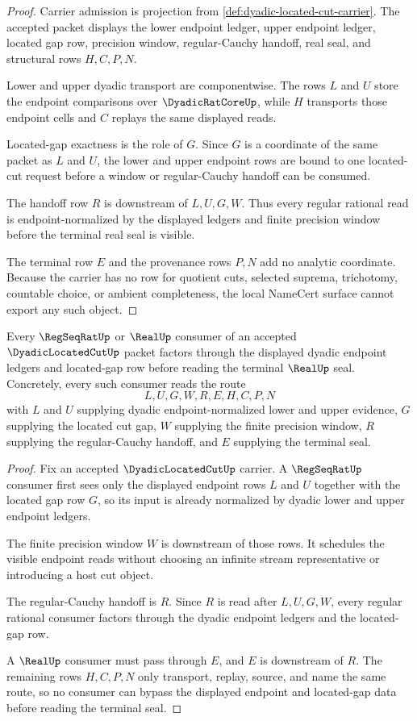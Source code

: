 \begin{proof}
Carrier admission is projection from \autoref{def:dyadic-located-cut-carrier}. The accepted packet displays the lower endpoint ledger, upper endpoint ledger, located gap row, precision window, regular-Cauchy handoff, real seal, and structural rows $H,C,P,N$.

Lower and upper dyadic transport are componentwise. The rows $L$ and $U$ store the endpoint comparisons over $\DyadicRatCoreUp$, while $H$ transports those endpoint cells and $C$ replays the same displayed reads.

Located-gap exactness is the role of $G$. Since $G$ is a coordinate of the same packet as $L$ and $U$, the lower and upper endpoint rows are bound to one located-cut request before a window or regular-Cauchy handoff can be consumed.

The handoff row $R$ is downstream of $L,U,G,W$. Thus every regular rational read is endpoint-normalized by the displayed ledgers and finite precision window before the terminal real seal is visible.

The terminal row $E$ and the provenance rows $P,N$ add no analytic coordinate. Because the carrier has no row for quotient cuts, selected suprema, trichotomy, countable choice, or ambient completeness, the local NameCert surface cannot export any such object.
\end{proof}

\begin{theorem}
\label{thm:dyadic-located-cut-regular-cauchy-handoff}
Every $\RegSeqRatUp$ or $\RealUp$ consumer of an accepted $\DyadicLocatedCutUp$ packet factors through the displayed dyadic endpoint ledgers and located-gap row before reading the terminal $\RealUp$ seal. Concretely, every such consumer reads the route
$$
L,U,G,W,R,E,H,C,P,N
$$
with $L$ and $U$ supplying dyadic endpoint-normalized lower and upper evidence, $G$ supplying the located cut gap, $W$ supplying the finite precision window, $R$ supplying the regular-Cauchy handoff, and $E$ supplying the terminal seal.
\end{theorem}
\begin{proof}
Fix an accepted $\DyadicLocatedCutUp$ carrier. A $\RegSeqRatUp$ consumer first sees only the displayed endpoint rows $L$ and $U$ together with the located gap row $G$, so its input is already normalized by dyadic lower and upper endpoint ledgers.

The finite precision window $W$ is downstream of those rows. It schedules the visible endpoint reads without choosing an infinite stream representative or introducing a host cut object.

The regular-Cauchy handoff is $R$. Since $R$ is read after $L,U,G,W$, every regular rational consumer factors through the dyadic endpoint ledgers and the located-gap row.

A $\RealUp$ consumer must pass through $E$, and $E$ is downstream of $R$. The remaining rows $H,C,P,N$ only transport, replay, source, and name the same route, so no consumer can bypass the displayed endpoint and located-gap data before reading the terminal seal.
\end{proof}

